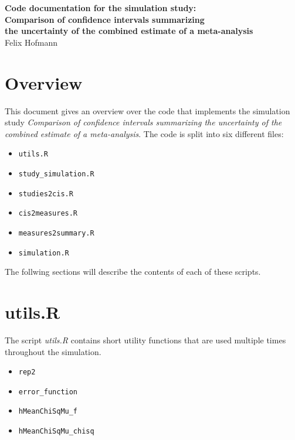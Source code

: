 \documentclass[letterpaper, 12pt]{article}\usepackage[]{graphicx}\usepackage[]{xcolor}
\begin{document}
\begin{center}
  {\noindent \LARGE \bf Code documentation for the simulation study:\\[2mm]
    Comparison of confidence intervals summarizing\\[2mm]
    the uncertainty of the combined estimate of a meta-analysis
  }\\
\bigskip
{\noindent \Large Felix Hofmann
}\end{center}
\bigskip
\vspace*{.5cm}

\tableofcontents

\newpage 

\section{Overview}

This document gives an overview over the code that implements the
simulation study \emph{Comparison of confidence intervals summarizing the
uncertainty of the combined estimate of a meta-analysis}. The code is split into
six different files:

\begin{itemize}
  \item \texttt{utils.R}
  \item \texttt{study\_simulation.R}
  \item \texttt{studies2cis.R}
  \item \texttt{cis2measures.R}
  \item \texttt{measures2summary.R}
  \item \texttt{simulation.R}
\end{itemize}

The follwing sections will describe the contents of each of these scripts.

\section{utils.R}



The script \emph{utils.R} contains short utility functions that are used
multiple times throughout the simulation.

\begin{itemize}
  \item \texttt{rep2}
  \item \texttt{error\_function}
  \item \texttt{hMeanChiSqMu\_f}
  \item \texttt{hMeanChiSqMu\_chisq}
\end{itemize}
\end{document}

